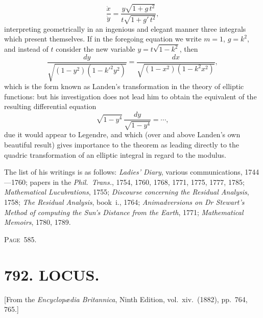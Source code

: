 \documentclass[11pt,a4paper]{article}
\theoremstyle{definition}
\begin{document}
\[
\frac{\dot{x}}{\dot{y}}=\frac{y\sqrt{1+g\,t^2}}{t\sqrt{1+g'\,t^2}},
\]
interpreting geometrically in an ingenious and elegant manner three integrals which present themselves. If in the foregoing equation we write $m=1$, $g=k^2$, and instead of $t$ consider the new variable $y=t\sqrt{1-k^2}$, then
\[
\frac{dy}{\sqrt{(1-y^2)(1-k'^2y^2)}}=\frac{dx}{\sqrt{(1-x^2)(1-k^2x^2)}},
\]
which is the form known as Landen's transformation in the theory of elliptic functions: but his investigation does not lead him to obtain the equivalent of the resulting differential equation
\[
\sqrt{1-y^4}\,\frac{dy}{\sqrt{1-y^4}}=\cdots,
\]
due it would appear to Legendre, and which (over and above Landen's own beautiful result) gives importance to the theorem as leading directly to the quadric transformation of an elliptic integral in regard to the modulus.

The list of his writings is as follows: \textit{Ladies' Diary}, various communications, 1744---1760; papers in the \textit{Phil.\ Trans.}, 1754, 1760, 1768, 1771, 1775, 1777, 1785; \textit{Mathematical Lucubrations}, 1755; \textit{Discourse concerning the Residual Analysis}, 1758; \textit{The Residual Analysis}, book~i., 1764; \textit{Animadversions on Dr Stewart's Method of computing the Sun's Distance from the Earth}, 1771; \textit{Mathematical Memoirs}, 1780, 1789.

\newpage
\noindent\textsc{Page~585.}

\section*{792. LOCUS.}

\begin{flushright}
\small[From the \textit{Encyclop{\ae}dia Britannica}, Ninth Edition, vol.~xiv.~(1882), pp.~764, 765.]
\end{flushright}
\end{document}
